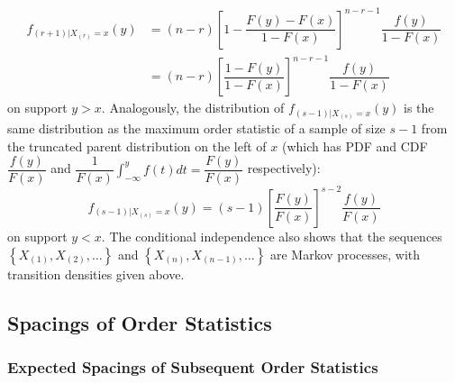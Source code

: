 \documentclass[11pt]{report} %
\begin{document}
\begin{align}
f_{\left(r + 1\right)|X_{\left(r\right)} = x}\left(y\right) &= \left(n - r\right)\left[1 - \dfrac{F\left(y\right) - F\left(x\right)}{1 - F\left(x\right)}\right]^{n - r - 1}\dfrac{f\left(y\right)}{1 - F\left(x\right)} \\
&= \left(n - r\right)\left[\dfrac{1 - F\left(y\right)}{1 - F\left(x\right)}\right]^{n - r - 1}\dfrac{f\left(y\right)}{1 - F\left(x\right)} 
\end{align}
on support $y > x$. Analogously, the distribution of $f_{\left(s - 1\right)|X_{\left(s\right)} = x}\left(y\right)$ is the same distribution as the maximum order statistic of a sample of size $s - 1$ from the truncated parent distribution on the left of $x$ (which has PDF and CDF $\dfrac{f\left(y\right)}{F\left(x\right)}$ and $\dfrac{1}{F\left(x\right)}\int_{-\infty}^{y}f\left(t\right)dt = \dfrac{F\left(y\right)}{F\left(x\right)}$ respectively):
\begin{equation}
f_{\left(s - 1\right)|X_{\left(s\right)} = x}\left(y\right) = \left(s - 1\right)\left[\dfrac{F\left(y\right)}{F\left(x\right)}\right]^{s - 2}\dfrac{f\left(y\right)}{F\left(x\right)}
\end{equation}
on support $y < x$. The conditional independence also shows that the sequences $\left\{X_{\left(1\right)}, X_{\left(2\right)}, \dots\right\}$ and $\left\{X_{\left(n\right)}, X_{\left(n - 1\right)}, \dots\right\}$ are Markov processes, with transition densities given above.

\subsection{Spacings of Order Statistics}

\subsubsection{Expected Spacings of Subsequent Order Statistics}
\end{document}
